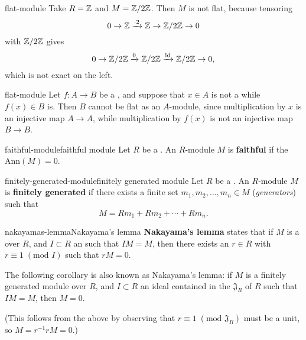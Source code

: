 \begin{example}{flat-module}
    Take $R = \mathbb{Z}$ and $M = \mathbb{Z}/2\mathbb{Z}$. Then $M$ is not flat, because tensoring
    \[ 0 \rightarrow \mathbb{Z} \xrightarrow{\cdot 2} \mathbb{Z} \rightarrow \mathbb{Z}/2\mathbb{Z} \to 0 \]
    with $\mathbb{Z}/2\mathbb{Z}$ gives
    \[ 0 \rightarrow \mathbb{Z}/2\mathbb{Z} \xrightarrow{0} \mathbb{Z}/2\mathbb{Z} \xrightarrow{\text{id}} \mathbb{Z}/2\mathbb{Z} \to 0 , \]
    which is not exact on the left.
\end{example}

\begin{example}{flat-module}
    Let $f : A \to B$ be a , and suppose that $x \in A$ is not a  while $f(x) \in B$ is. Then $B$ cannot be flat as an $A$-module, since multiplication by $x$ is an injective map $A \to A$, while multiplication by $f(x)$ is not an injective map $B \to B$.
\end{example}

\begin{topic}{faithful-module}{faithful module}
     Let $R$ be a . An $R$-module $M$ is \textbf{faithful} if the  $\text{Ann}(M) = 0$.
\end{topic}

\begin{topic}{finitely-generated-module}{finitely generated module}
    Let $R$ be a . An $R$-module $M$ is \textbf{finitely generated} if there exists a finite set $m_1, m_2, \ldots, m_n \in M$ (\textit{generators}) such that
    \[ M = R m_1 + R m_2 + \cdots + R m_n . \]
\end{topic}

\begin{topic}{nakayamas-lemma}{Nakayama's lemma}
    \textbf{Nakayama's lemma} states that if $M$ is a  over $R$, and $I \subset R$ an  such that $IM = M$, then there exists an $r \in R$ with $r \equiv 1 \; (\text{mod } I)$ such that $rM = 0$.
    
    The following corollary is also known as Nakayama's lemma: if $M$ is a finitely generated module over $R$, and $I \subset R$ an ideal contained in the  $\mathfrak{J}_R$ of $R$ such that $IM = M$, then $M = 0$.
    
    (This follows from the above by observing that $r \equiv 1 \; (\text{mod } \mathfrak{J}_R)$ must be a unit, so $M = r^{-1} r M = 0$.)
\end{topic}

